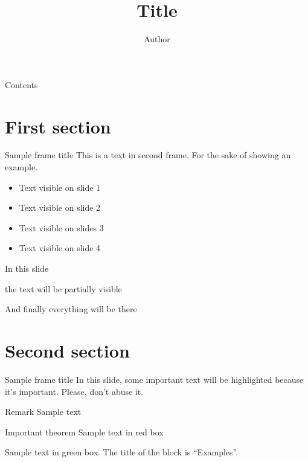 \documentclass{ibeamer}
\author{Author}
\institute{Institute}
\title{Title}
\begin{document}
\frame{\titlepage}

\begin{frame}{Contents}
	\tableofcontents
\end{frame}

\section{First section}

\begin{frame}{Sample frame title}
	This is a text in second frame. For the sake of showing an example.

	\begin{itemize}
		\item<1-> Text visible on slide 1
		\item<2-> Text visible on slide 2
		\item<3> Text visible on slides 3
		\item<4-> Text visible on slide 4
	\end{itemize}
\end{frame}

\begin{frame}
	In this slide \pause

	the text will be partially visible \pause

	And finally everything will be there
\end{frame}

\section{Second section}

\begin{frame}{Sample frame title}
	In this slide, some important text will be \alert{highlighted} because it's important.
	Please, don't abuse it.

	\begin{block}{Remark}
		Sample text
	\end{block}

	\begin{alertblock}{Important theorem}
		Sample text in red box
	\end{alertblock}

	\begin{examples}
		Sample text in green box. The title of the block is ``Examples''.
	\end{examples}
\end{frame}
\end{document}
